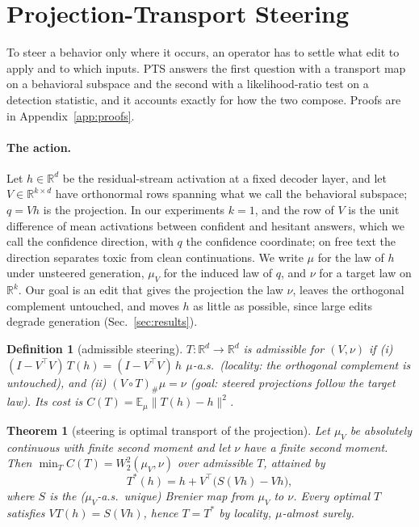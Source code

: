 \documentclass{article}
\newtheorem{theorem}{Theorem}
\newtheorem{definition}{Definition}
\newcommand{\Wtwo}{W_2}
\begin{document}
\section{Projection-Transport Steering}
\label{sec:method}

To steer a behavior only where it occurs, an operator has to settle what edit
to apply and to which inputs. PTS answers the first question with a transport
map on a behavioral subspace and the second with a likelihood-ratio test on a
detection statistic, and it accounts exactly for how the two compose. Proofs
are in Appendix~\ref{app:proofs}.

\paragraph{The action.} Let $h\in\mathbb{R}^d$ be the residual-stream activation
at a fixed decoder layer, and let $V\in\mathbb{R}^{k\times d}$ have orthonormal
rows spanning what we call the behavioral subspace; $q=Vh$ is the projection.
In our experiments $k=1$, and the row of $V$ is the unit difference of mean
activations between confident and hesitant answers, which we call the
confidence direction, with $q$ the confidence coordinate; on free text the
direction separates toxic from clean continuations. We write $\mu$ for the law
of $h$ under unsteered generation, $\mu_V$ for the induced law of $q$, and
$\nu$ for a target law on $\mathbb{R}^k$. Our goal is an edit that gives the
projection the law $\nu$, leaves the orthogonal complement untouched, and
moves $h$ as little as possible, since large edits degrade generation
(Sec.~\ref{sec:results}).

\begin{definition}[admissible steering]
\label{def:local}
$T:\mathbb{R}^d\to\mathbb{R}^d$ is admissible for $(V,\nu)$ if
(i) $(I-V^\top V)\,T(h)=(I-V^\top V)\,h$ $\mu$-a.s.\ (\emph{locality}: the
orthogonal complement is untouched), and (ii) $(V\!\circ T)_{\#}\mu=\nu$
(\emph{goal}: steered projections follow the target law). Its cost is
$C(T)=\mathbb{E}_\mu\lVert T(h)-h\rVert^2$.
\end{definition}

\begin{theorem}[steering is optimal transport of the projection]
\label{thm:ot}
Let $\mu_V$ be absolutely continuous with finite second moment and let $\nu$
have a finite second moment. Then $\min_T C(T)=\Wtwo^2(\mu_V,\nu)$ over
admissible $T$, attained by
\begin{equation}
T^*(h)=h+V^\top\big(S(Vh)-Vh\big),
\label{eq:edit}
\end{equation}
where $S$ is the ($\mu_V$-a.s.\ unique) Brenier map from $\mu_V$ to $\nu$.
Every optimal $T$ satisfies $VT(h)=S(Vh)$, hence $T=T^*$ by locality,
$\mu$-almost surely.
\end{theorem}
\end{document}
